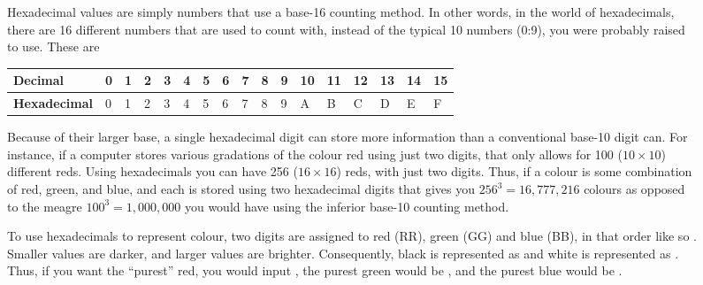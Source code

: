 \begin{figure}
    \centering
\begin{mdframed}[style = miscFrame, frametitle = Box 2.2: Hexadecimal Notation for Colours]

Hexadecimal values are simply numbers that use a base-16 counting method. In other words, in the world of hexadecimals, there are 16 different numbers that are used to count with, instead of the typical 10 numbers (0:9), you were probably raised to use. These are 

\vspace{1em}

\begin{table}[H]
\centering
\begin{tabular}{|l|l|l|l|l|l|l|l|l|l|l|l|l|l|l|l|l|}
\hline
\textbf{Decimal}     & 0 & 1 & 2 & 3 & 4 & 5 & 6 & 7 & 8 & 9 & 10 & 11 & 12 & 13 & 14 & 15 \\ \hline
\textbf{Hexadecimal} & 0 & 1 & 2 & 3 & 4 & 5 & 6 & 7 & 8 & 9 & A  & B  & C  & D  & E  & F  \\ \hline
\end{tabular}
\end{table}

\vspace{1em}

\noindent
Because of their larger base, a single hexadecimal digit can store more information than a conventional base-10 digit can.  For instance, if a computer stores various gradations of the colour red using just two digits, that only allows for 100 ($10 \times 10$) different reds. Using hexadecimals you can have 256 ($16 \times 16$) reds, with just two digits.  Thus, if a colour is some combination of red, green, and blue, and each is stored using two hexadecimal digits that gives you $256^3 = 16,777,216$ colours as opposed to the meagre $100^3 = 1,000,000$ you would have using the inferior base-10 counting method.

\vspace{1em}

To use hexadecimals to represent colour, two digits are assigned to red (RR), green (GG) and blue (BB), in that order like so .  Smaller values are darker, and larger values are brighter.  Consequently, black is represented as  and white is represented as . Thus, if you want the ``purest'' red, you would input , the purest green would be , and the purest blue would be .
\end{mdframed}
\end{figure}

